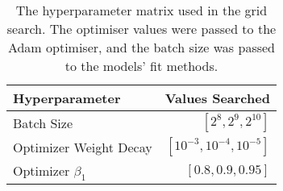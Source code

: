 \begin{table}[H]
\centering
\begin{tabular}{lr}
\toprule
Hyperparameter & Values Searched \\
\midrule
Batch Size & $\left[2^{8}, 2^{9}, 2^{10}\right]$ \\
Optimizer Weight Decay & $\left[10^{-3}, 10^{-4}, 10^{-5}\right]$ \\
Optimizer $\beta_1$ & $\left[0.8, 0.9, 0.95\right]$ \\
\bottomrule
\end{tabular}
\caption{The hyperparameter matrix used in the grid search. The optimiser values were passed to the Adam optimiser, and the batch size was passed to the models' fit methods.}
\label{param-grid}
\end{table}
